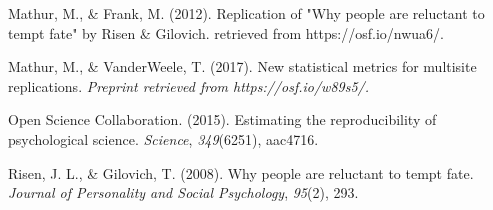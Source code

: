 \documentclass[english,floatsintext,man]{apa6}
\theoremstyle{definition}
\theoremstyle{definition}
\theoremstyle{definition}
\theoremstyle{remark}
\begin{document}
\hypertarget{ref-my_rpp_writeup}{}
Mathur, M., \& Frank, M. (2012). Replication of "Why people are
reluctant to tempt fate" by Risen \& Gilovich. retrieved from
https://osf.io/nwua6/.

\hypertarget{ref-mathur_rrr}{}
Mathur, M., \& VanderWeele, T. (2017). New statistical metrics for
multisite replications. \emph{Preprint retrieved from
https://osf.io/w89s5/.}

\hypertarget{ref-rpp}{}
Open Science Collaboration. (2015). Estimating the reproducibility of
psychological science. \emph{Science}, \emph{349}(6251), aac4716.

\hypertarget{ref-risen}{}
Risen, J. L., \& Gilovich, T. (2008). Why people are reluctant to tempt
fate. \emph{Journal of Personality and Social Psychology}, \emph{95}(2),
293.
\end{document}
